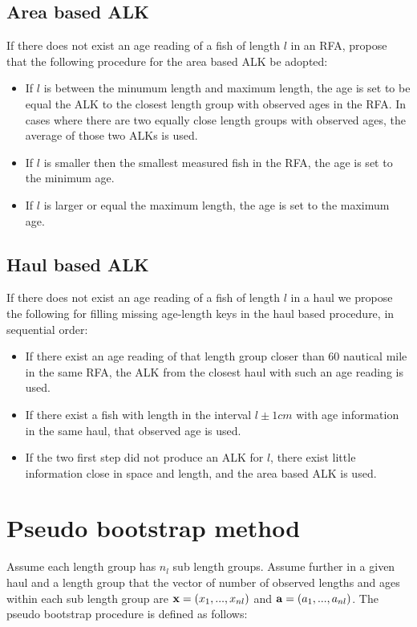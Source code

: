 \documentclass[a4paper 12pt]{article}
\numberwithin{equation}{section}
\begin{document}
\subsection{\normalsize Area based ALK}
\label{secAp:DATRASBorrow}
If there does not exist an age reading of a fish of length $l$ in an RFA,  \citet{ICES2013} propose that the following procedure  for the area based ALK be adopted:
\begin{itemize}
\item If $l$ is between the minumum length and maximum length, the age is set to be equal the ALK to the closest length group with observed ages in the RFA. In cases where there are two equally close length groups with observed ages, the average of those two ALKs is used. 
\item If $l$ is smaller then the smallest measured fish in the RFA, the age is set to the minimum age.
\item If $l$ is larger or equal the maximum length, the age is set to the maximum age.
\end{itemize}


\subsection{\normalsize Haul based ALK}
\label{secAp:oursBorrow}
If there does not exist an age reading of a fish of length $l$ in a haul we propose the following for filling missing age-length keys in the  haul based procedure, in sequential order:
\begin{itemize}
\item If there exist an age reading of that length group closer than 60 nautical mile in the same RFA, the ALK from the closest haul with such an age reading is used.
\item If there exist a fish with length in the interval $l\pm 1cm$ with age information in the same haul, that observed age is used.  
\item If the two first step did not produce an ALK for $l$, there exist little information close in space and length, and the area based ALK is used.
\end{itemize}


\section{Pseudo bootstrap method}
\label{secAp:pseudobootstrap}
Assume each length group has $n_{l}$ sub length groups. Assume further in a given haul and a length group that the vector of number of observed lengths and ages within each sub length group are ${\bf x} = \left(x_{1},...,x_{nl}\right)$ and ${\bf a} = \left(a_{1},...,a_{nl}\right)$.  The pseudo bootstrap procedure is defined as follows:
\end{document}
